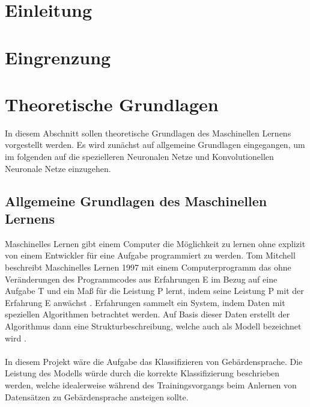 \documentclass[11pt,bibliography=totocnumbered]{scrartcl}
\begin{document}
\section{Einleitung}
\section{Eingrenzung}
\section{Theoretische Grundlagen}
In diesem Abschnitt sollen theoretische Grundlagen des Maschinellen Lernens vorgestellt werden. Es wird zunächst auf allgemeine Grundlagen eingegangen, um im folgenden auf die spezielleren Neuronalen Netze und Konvolutionellen Neuronale Netze einzugehen.
\subsection{Allgemeine Grundlagen des Maschinellen Lernens}
Maschinelles Lernen gibt einem Computer die Möglichkeit zu lernen ohne explizit von einem Entwickler für eine Aufgabe programmiert zu werden. Tom Mitchell beschreibt Maschinelles Lernen 1997 mit einem Computerprogramm das ohne Veränderungen des Programmcodes aus Erfahrungen E im Bezug auf eine Aufgabe T und ein Maß für die Leistung P lernt, indem seine Leistung P mit der Erfahrung E anwächst \cite[S. 4]{MACHINE_LEARNING}. Erfahrungen sammelt ein System, indem Daten mit speziellen Algorithmen betrachtet werden. Auf Basis dieser Daten erstellt der Algorithmus dann eine Strukturbeschreibung, welche auch als Modell bezeichnet wird \cite[S. 2]{DEEP_LEARNING}.
\\\\
In diesem Projekt wäre die Aufgabe das Klassifizieren von Gebärdensprache. Die Leistung des Modells würde durch die korrekte Klassifizierung beschrieben werden, welche idealerweise während des Trainingsvorgangs beim Anlernen von Datensätzen zu Gebärdensprache ansteigen sollte.
\end{document}
